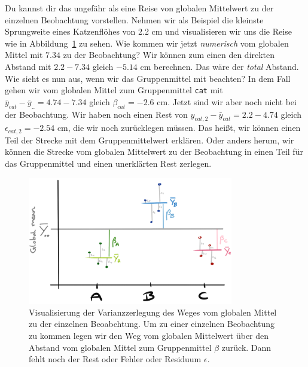 \documentclass[
  letterpaper,
  DIV=11,
  oneside]{scrreport}
\begin{document}
Du kannst dir das ungefähr als eine Reise von globalen Mittelwert zu der
einzelnen Beobachtung vorstellen. Nehmen wir als Beispiel die kleinste
Sprungweite eines Katzenflöhes von 2.2 cm und visualisieren wir uns die
Reise wie in Abbildung~\ref{fig-single-cat-anova} zu sehen. Wie kommen
wir jetzt \emph{numerisch} vom globalen Mittel mit \(7.34\) zu der
Beobachtung? Wir können zum einen den direkten Abstand mit
\(2.2 - 7.34\) gleich \(-5.14\) cm berechnen. Das wäre der \emph{total}
Abstand. Wie sieht es nun aus, wenn wir das Gruppenmittel mit beachten?
In dem Fall gehen wir vom globalen Mittel zum Gruppenmittel \texttt{cat}
mit \(\bar{y}_{cat} - \bar{y}_{..} = 4.74 -7.34\) gleich
\(\beta_{cat} = -2.6\) cm. Jetzt sind wir aber noch nicht bei der
Beobachtung. Wir haben noch einen Rest von
\(y_{cat,2} - \bar{y}_{cat} = 2.2 - 4.74\) gleich
\(\epsilon_{cat, 2} = -2.54\) cm, die wir noch zurücklegen müssen. Das
heißt, wir können einen Teil der Strecke mit dem Gruppenmittelwert
erklären. Oder anders herum, wir können die Strecke vom globalen
Mittelwert zu der Beobachtung in einen Teil für das Gruppenmittel und
einen unerklärten Rest zerlegen.

\begin{figure}

{\centering \includegraphics[width=0.8\textwidth,height=\textheight]{./images/anova-pre-01.png}

}

\caption{\label{fig-single-cat-anova}Visualisierung der Varianzzerlegung
des Weges vom globalen Mittel zu der einzelnen Beoabchtung. Um zu einer
einzelnen Beobachtung zu kommen legen wir den Weg vom globalen
Mittelwert über den Abstand vom globalen Mittel zum Gruppenmittel
\(\beta\) zurück. Dann fehlt noch der Rest oder Fehler oder Residuum
\(\epsilon\).}

\end{figure}
\end{document}
